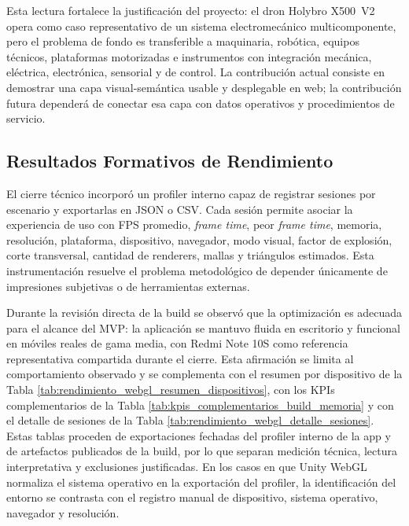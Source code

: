 Esta lectura fortalece la justificación del proyecto: el dron Holybro X500~V2 opera como caso representativo de un sistema electromecánico multicomponente, pero el problema de fondo es transferible a maquinaria, robótica, equipos técnicos, plataformas motorizadas e instrumentos con integración mecánica, eléctrica, electrónica, sensorial y de control. La contribución actual consiste en demostrar una capa visual-semántica usable y desplegable en web; la contribución futura dependerá de conectar esa capa con datos operativos y procedimientos de servicio.

\FloatBarrier
\subsection{Resultados Formativos de Rendimiento}

El cierre técnico incorporó un profiler interno capaz de registrar sesiones por escenario y exportarlas en JSON o CSV. Cada sesión permite asociar la experiencia de uso con FPS promedio, \textit{frame time}, peor \textit{frame time}, memoria, resolución, plataforma, dispositivo, navegador, modo visual, factor de explosión, corte transversal, cantidad de renderers, mallas y triángulos estimados. Esta instrumentación resuelve el problema metodológico de depender únicamente de impresiones subjetivas o de herramientas externas.

Durante la revisión directa de la build se observó que la optimización es adecuada para el alcance del MVP: la aplicación se mantuvo fluida en escritorio y funcional en móviles reales de gama media, con Redmi Note 10S como referencia representativa compartida durante el cierre. Esta afirmación se limita al comportamiento observado y se complementa con el resumen por dispositivo de la Tabla \ref{tab:rendimiento_webgl_resumen_dispositivos}, con los KPIs complementarios de la Tabla \ref{tab:kpis_complementarios_build_memoria} y con el detalle de sesiones de la Tabla \ref{tab:rendimiento_webgl_detalle_sesiones}. Estas tablas proceden de exportaciones fechadas del profiler interno de la app y de artefactos publicados de la build, por lo que separan medición técnica, lectura interpretativa y exclusiones justificadas. En los casos en que Unity WebGL normaliza el sistema operativo en la exportación del profiler, la identificación del entorno se contrasta con el registro manual de dispositivo, sistema operativo, navegador y resolución.



